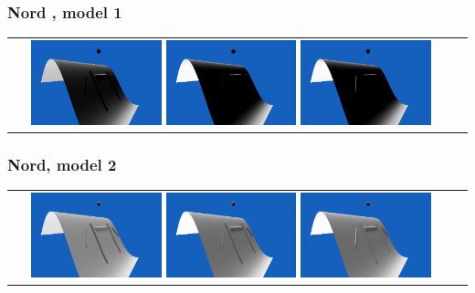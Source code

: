 \documentclass[a4paper]{article}
\begin{document}
\subsubsection{Nord , model 1}
\begin{tabular}{cc}
\includegraphics[width=0.3\textwidth]{Images/Essais/Essai_8_phong_North_0.png}
\includegraphics[width=0.3\textwidth]{Images/Essais/Essai_8_slint_North_0.png}
\includegraphics[width=0.3\textwidth]{Images/Essais/Essai_9_slint_North_0.png}
\end{tabular}


\subsubsection{Nord, model 2}
\begin{tabular}{cc}
\includegraphics[width=0.3\textwidth]{Images/Essais/Essai_8_phong_North_1.png}
\includegraphics[width=0.3\textwidth]{Images/Essais/Essai_8_slint_North_1.png}
\includegraphics[width=0.3\textwidth]{Images/Essais/Essai_9_slint_North_1.png}
\end{tabular}
\end{document}

